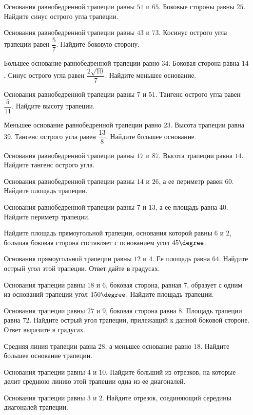 \begin{class}[number=3]
	\begin{listofex}
		\item Основания равнобедренной трапеции равны \(51\) и \(65\). Боковые стороны равны \(25\). Найдите синус острого угла трапеции.
		\item Основания равнобедренной трапеции равны \(43\) и \(73\). Косинус острого угла трапеции равен \(\dfrac{ 5 }{ 7 }\).  Найдите боковую сторону.
		\item Большее основание равнобедренной трапеции равно \(34\). Боковая сторона равна \(14\). Синус острого угла равен \(\dfrac{ 2\sqrt{10} }{ 7 }\).  Найдите меньшее основание.
		\item Основания равнобедренной трапеции равны \(7\) и \(51\). Тангенс острого угла равен \(\dfrac{ 5 }{ 11 }\).  Найдите высоту трапеции.
		\item Меньшее основание равнобедренной трапеции равно \(23\). Высота трапеции равна \(39\). Тангенс острого угла равен \(\dfrac{ 13 }{ 8 }\). Найдите большее основание.
		\item Основания равнобедренной трапеции равны \(17\) и \(87\). Высота трапеции равна \(14\). Найдите тангенс острого угла.
		\item Основания равнобедренной трапеции равны \(14\) и \(26\), а ее периметр равен \(60\). Найдите площадь трапеции.
		\item Основания равнобедренной трапеции равны \(7\) и \(13\), а ее площадь равна \(40\). Найдите периметр трапеции.
		\item Найдите площадь прямоугольной трапеции, основания которой равны \(6\) и \(2\), большая боковая сторона составляет с основанием угол \(45\degree\).
		\item Основания прямоугольной трапеции равны \(12\) и \(4\). Ее площадь равна \(64\). Найдите острый угол этой трапеции. Ответ дайте в градусах.
		\item Основания трапеции равны \(18\) и \(6\), боковая сторона, равная \(7\), образует с одним из оснований трапеции угол \(150\degree\). Найдите площадь трапеции.
		\item Основания трапеции равны \(27\) и \(9\), боковая сторона равна \(8\). Площадь трапеции равна \(72\). Найдите острый угол трапеции, прилежащий к данной боковой стороне. Ответ выразите в градусах.
		\item Средняя линия трапеции равна \(28\), а меньшее основание равно \(18\). Найдите большее основание трапеции.
		\item Основания трапеции равны \(4\) и \(10\). Найдите больший из отрезков, на которые делит среднюю линию этой трапеции одна из ее диагоналей.
		\item Основания трапеции равны \(3\) и \(2\). Найдите отрезок, соединяющий середины диагоналей трапеции.
	\end{listofex}
\end{class}

